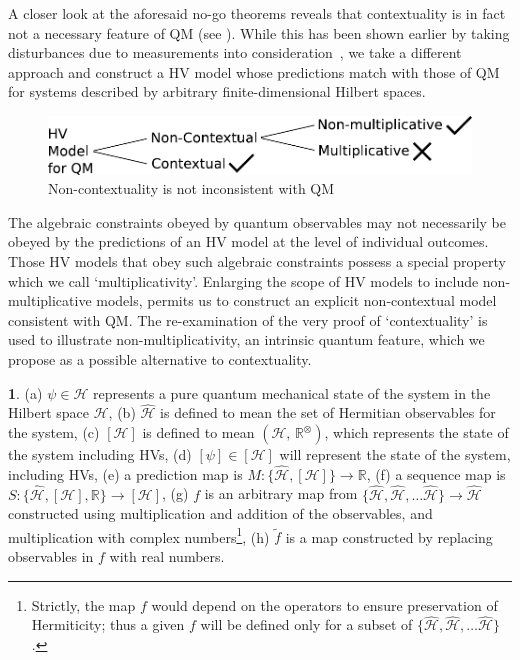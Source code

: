 \documentclass[british,aps,prl,superscriptaddress,nofootinbib,times,reprint]{revtex4-1}
\theoremstyle{plain}
\theoremstyle{plain}
\theoremstyle{definition}
\theoremstyle{remark}
\theoremstyle{remark}
\theoremstyle{remark}
\theoremstyle{plain}
\theoremstyle{plain}
\theoremstyle{plain}
\theoremstyle{definition}
\theoremstyle{definition}
\newtheorem*{notn*}{\protect\notationname}
\providecommand{\notationname}{Notation}
\begin{document}
A closer look at the aforesaid no-go theorems
reveals that contextuality is in fact not a
necessary feature of QM (see ).
While this has been shown earlier by taking
disturbances due to measurements into
consideration~\cite{NoContextuality},
we take a different approach 
and construct a 
HV model whose 
predictions match with those of QM for systems
described by arbitrary finite-dimensional Hilbert
spaces.  \begin{figure}[h]
\includegraphics[width=0.9\columnwidth]{block1}
\caption{Non-contextuality is not inconsistent
with QM} \label{fig:block}\end{figure} The
algebraic constraints obeyed by quantum
observables may not necessarily be obeyed by the
predictions of an HV model at the level of
individual outcomes.  Those HV models that obey
such algebraic constraints possess a special
property which we call `multiplicativity'.  
Enlarging the scope of HV models to include
non-multiplicative models, permits us to construct an
explicit non-contextual model consistent with QM.
The re-examination of the very proof of
`contextuality'  is used to illustrate
non-multiplicativity, an intrinsic quantum feature, 
which we propose as a possible alternative to contextuality. 


\begin{notn*}
(a) $\psi\in\mathcal{H}$ 
represents a pure quantum mechanical
state of the system in the Hilbert space
$\mathcal{H}$, (b) $\hat{\mathcal{H}}$ is defined
to mean the set of Hermitian 
observables for the system, (c)
$[\mathcal{H}]$ is defined to mean
$(\mathcal{H},\,\mathbb{R}^{\otimes})$, which
represents the state of the system including HVs,
(d) $[\psi]\in[\mathcal{H}]$ will represent the
state of the system, including HVs, (e) a
prediction map is
$M:\{ \hat{\mathcal{H}},[\mathcal{H}] \}\to\mathbb{R}$,
(f) a sequence map is
$S:\{ \hat{\mathcal{H}},[\mathcal{H}],\mathbb{R} \}\to[\mathcal{H}]$,
(g) $f$ is an arbitrary map from $\{
\hat{\mathcal{H}},\hat{\mathcal{H}},\dots\hat{\mathcal{H}}
\} \to \hat{\mathcal{H}}$ constructed using
multiplication and addition of the observables,
and multiplication with complex
numbers\footnote{Strictly, the map $f$ would
depend on the operators to ensure preservation of
Hermiticity; thus a given $f$ will be defined only
for a subset of $\{
\hat{\mathcal{H}},\hat{\mathcal{H}},\dots\hat{\mathcal{H}}
\}$.}, (h) $\tilde{f}$ is a map constructed by
replacing observables in $f$ with real numbers.
\end{notn*}
\end{document}
